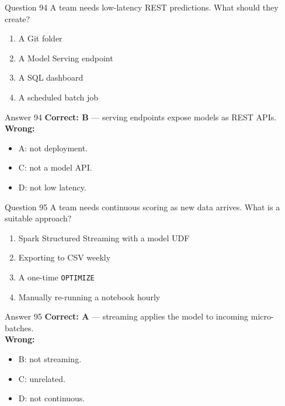 \documentclass[aspectratio=169,11pt]{beamer}
\begin{document}
	\begin{frame}{Question 94}
		A team needs low-latency REST predictions. What should they create?
		\begin{enumerate}[label=\Alph*.]
			\item A Git folder
			\item A Model Serving endpoint
			\item A SQL dashboard
			\item A scheduled batch job
		\end{enumerate}
	\end{frame}
	\begin{frame}{Answer 94}
		\textbf{Correct: B} --- serving endpoints expose models as REST APIs.\\
		\vspace{0.5em}
		\textbf{Wrong:}
		\begin{itemize}
			\item A: not deployment.
			\item C: not a model API.
			\item D: not low latency.
		\end{itemize}
	\end{frame}
	
	\begin{frame}{Question 95}
		A team needs continuous scoring as new data arrives. What is a suitable approach?
		\begin{enumerate}[label=\Alph*.]
			\item Spark Structured Streaming with a model UDF
			\item Exporting to CSV weekly
			\item A one-time \texttt{OPTIMIZE}
			\item Manually re-running a notebook hourly
		\end{enumerate}
	\end{frame}
	\begin{frame}{Answer 95}
		\textbf{Correct: A} --- streaming applies the model to incoming micro-batches.\\
		\vspace{0.5em}
		\textbf{Wrong:}
		\begin{itemize}
			\item B: not streaming.
			\item C: unrelated.
			\item D: not continuous.
		\end{itemize}
	\end{frame}
	
\end{document}
